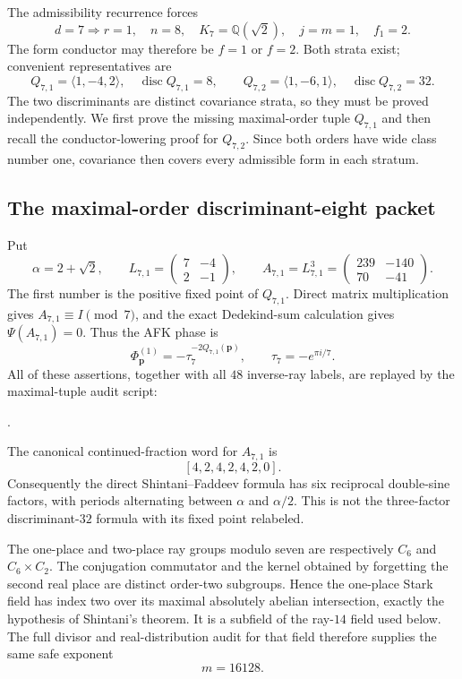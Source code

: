 \documentclass[11pt]{article}
\newcommand{\Q}{\mathbb Q}
\begin{document}
The admissibility recurrence forces
\[
 d=7\Longrightarrow
 r=1,\quad n=8,\quad K_7=\Q(\sqrt2),\quad
 j=m=1,\quad f_1=2.
\]
The form conductor may therefore be $f=1$ or $f=2$.  Both strata
exist; convenient representatives are
\[
 Q_{7,1}=\langle1,-4,2\rangle,\quad
 \operatorname{disc}Q_{7,1}=8,
 \qquad
 Q_{7,2}=\langle1,-6,1\rangle,\quad
 \operatorname{disc}Q_{7,2}=32.
\]
The two discriminants are distinct covariance strata, so they must be
proved independently.  We first prove the missing maximal-order tuple
$Q_{7,1}$ and then recall the conductor-lowering proof for
$Q_{7,2}$.  Since both orders have wide class number one, covariance
then covers every admissible form in each stratum.

\subsection{The maximal-order discriminant-eight packet}

Put
\[
 \alpha=2+\sqrt2,\qquad
 L_{7,1}=\begin{pmatrix}7&-4\\2&-1\end{pmatrix},\qquad
 A_{7,1}=L_{7,1}^3
 =\begin{pmatrix}239&-140\\70&-41\end{pmatrix}.
\]
The first number is the positive fixed point of $Q_{7,1}$.  Direct
matrix multiplication gives $A_{7,1}\equiv I\pmod7$, and the exact
Dedekind-sum calculation gives $\Psi(A_{7,1})=0$.  Thus the AFK phase
is
\[
 \Phi^{(1)}_{\boldsymbol p}
 =-\tau_7^{-2Q_{7,1}(\boldsymbol p)},\qquad
 \tau_7=-e^{\pi i/7}.
\tag{3}
\]
All of these assertions, together with all $48$ inverse-ray labels,
are replayed by the maximal-tuple audit script:
\begin{center}\small
{}.
\end{center}

The canonical continued-fraction word for $A_{7,1}$ is
\[
 [4,2,4,2,4,2,0].
\tag{4}
\]
Consequently the direct Shintani--Faddeev formula has six reciprocal
double-sine factors, with periods alternating between $\alpha$ and
$\alpha/2$.  This is not the three-factor discriminant-$32$ formula
with its fixed point relabeled.

The one-place and two-place ray groups modulo seven are respectively
$C_6$ and $C_6\times C_2$.  The conjugation commutator and the kernel
obtained by forgetting the second real place are distinct order-two
subgroups.  Hence the one-place Stark field has index two over its
maximal absolutely abelian intersection, exactly the hypothesis of
Shintani's theorem.  It is a subfield of the ray-$14$ field used
below.  The full divisor and real-distribution audit for that field
therefore supplies the same safe exponent
\[
 m=16128.
\tag{5}
\]
\end{document}
